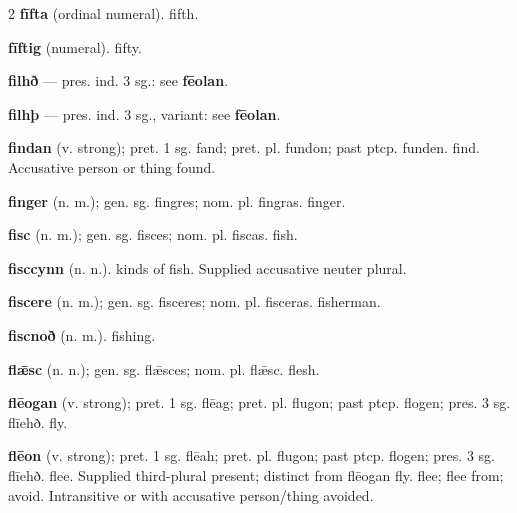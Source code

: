 \begin{multicols*}{2}
\textbf{fīfta} (ordinal numeral). fifth.\par
\textbf{fīftig} (numeral). fifty.\par
\textbf{filhð} — pres. ind. 3 sg.: see \textbf{fēolan}.\par
\textbf{filhþ} — pres. ind. 3 sg., variant: see \textbf{fēolan}.\par
\textbf{findan} (v. strong); pret. 1 sg. fand; pret. pl. fundon; past ptcp. funden. find. Accusative person or thing found.\par
\textbf{finger} (n. m.); gen. sg. fingres; nom. pl. fingras. finger.\par
\textbf{fisc} (n. m.); gen. sg. fisces; nom. pl. fiscas. fish.\par
\textbf{fisccynn} (n. n.). kinds of fish. Supplied accusative neuter plural.\par
\textbf{fiscere} (n. m.); gen. sg. fisceres; nom. pl. fisceras. fisherman.\par
\textbf{fiscnoð} (n. m.). fishing.\par
\textbf{flǣsc} (n. n.); gen. sg. flǣsces; nom. pl. flǣsc. flesh.\par
\textbf{flēogan} (v. strong); pret. 1 sg. flēag; pret. pl. flugon; past ptcp. flogen; pres. 3 sg. flīehð. fly.\par
\textbf{flēon} (v. strong); pret. 1 sg. flēah; pret. pl. flugon; past ptcp. flogen; pres. 3 sg. flīehð. flee. Supplied third-plural present; distinct from flēogan fly. flee; flee from; avoid. Intransitive or with accusative person/thing avoided.\par

\end{multicols*}

